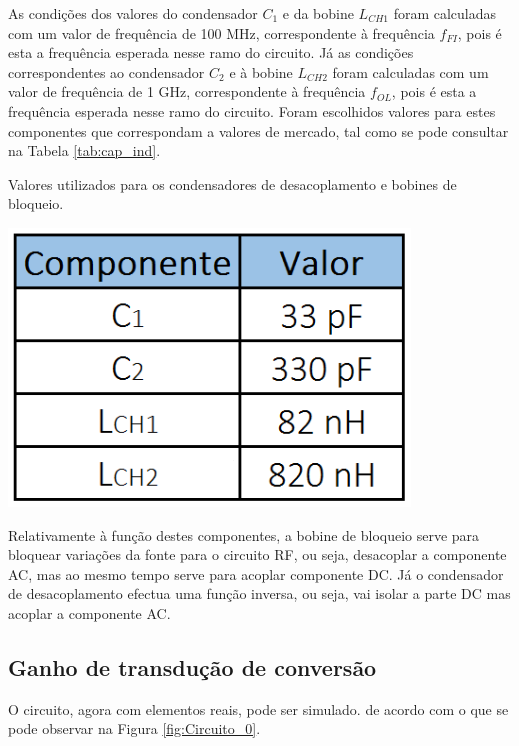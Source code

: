 \documentclass[11pt]{article}
\numberwithin{equation}{section}
\begin{document}
\vspace{2mm}
As condições dos valores do condensador $ C_{1} $ e da bobine $ L_{CH1} $ foram calculadas com um valor de frequência de 100 MHz, correspondente à frequência $f_{FI}$, pois é esta a frequência esperada nesse ramo do circuito. Já as condições correspondentes ao condensador $ C_{2} $ e à bobine $ L_{CH2} $ foram calculadas com um valor de frequência de 1 GHz, correspondente à frequência $ f_{OL} $, pois é esta a frequência esperada nesse ramo do circuito. Foram escolhidos valores para estes componentes que correspondam a valores de mercado, tal como se pode consultar	 na Tabela \ref{tab:cap_ind}.

\begin{table}[h]
	\centering
	\caption{Valores utilizados para os condensadores de desacoplamento e bobines de bloqueio.}
	\vspace{-1.5mm}
	\includegraphics[keepaspectratio=true, scale=0.37]{teoricas/componentes}
	\label{tab:cap_ind}
\end{table}

Relativamente à função destes componentes, a bobine de bloqueio serve para bloquear variações da fonte para o circuito RF, ou seja, desacoplar a componente AC, mas ao mesmo tempo serve para acoplar componente DC. Já o condensador de desacoplamento efectua uma função inversa, ou seja, vai isolar a parte DC mas acoplar a componente AC.

\subsection{Ganho de transdução de conversão}  

O circuito, agora com elementos reais, pode ser simulado. de acordo com o que se pode observar na Figura \ref{fig:Circuito_0}.
\end{document}

